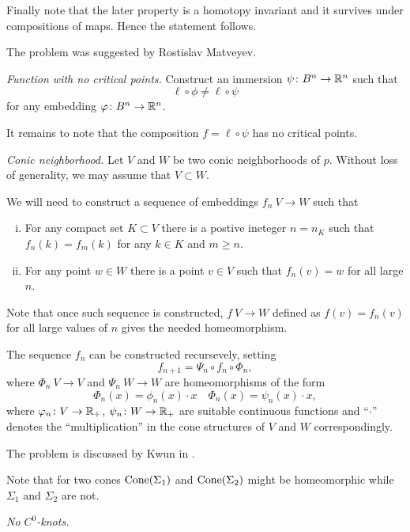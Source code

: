 Finally note that the later property is a homotopy invariant 
and it survives under compositions of maps.
Hence the statement follows.

 The problem was suggested by Rostislav Matveyev.

\textit{Function with no critical points.}
Construct an immersion $\psi\:B^n\z\to\RR^n$ such that 
\[\ell\circ\phi\ne\ell\circ\psi\]
for any embedding  $\varphi\colon B^n\to\mathbb{R}^n$.

It remains to note that the composition $f=\ell\circ\psi$ has no critical points.

\textit{Conic neighborhood.}
Let $V$ and $W$ be two conic neighborhoods of $p$.
Without loss of generality, we may assume that $V\subset W$.

We will need to construct a sequence of embeddings $f_n\:V\to W$
such that 
\begin{enumerate}[(i)]
\item 
For any compact set $K\subset V$ 
there is a postive ineteger $n=n_K$ such that 
$f_n(k)=f_m(k)$ for any $k\in K$ and $m\ge n$.
\item For any point $w\in W$ there is a point $v\in V$ such that $f_n(v)=w$ for all large $n$.
\end{enumerate}

Note that once such sequence is constructed, $f\:V\to W$ defined as $f(v)=f_n(v)$ for all large values of $n$ gives the needed homeomorphism.

The sequence $f_n$ can be constructed recursevely, setting
\[f_{n+1}=\Psi_n\circ f_n\circ \Phi_n,\]
where $\Phi_n\:V\to V$ 
and $\Psi_n\:W\to W$ 
are homeomorphisms
of the form 
\[\Phi_n(x)=\phi_n(x)\cdot x\quad \Phi_n(x)=\psi_n(x)\cdot x,\]
where $\varphi_n\colon V\to \mathbb{R}_+$, $\psi_n\colon W\to \mathbb{R}_+$ are suitable continuous functions 
and 
``$\cdot$'' denotes the ``multiplication'' in the cone structures of $V$ and $W$ correspondingly.

The problem is discussed by Kwun in \cite{kwun}.

Note that for two cones $\mathop{\rm Cone}(\Sigma_1)$ and $\mathop{\rm Cone}(\Sigma_2)$ might be homeomorphic while $\Sigma_1$ and $\Sigma_2$ are not.



\textit{No $C^0$-knots.}

